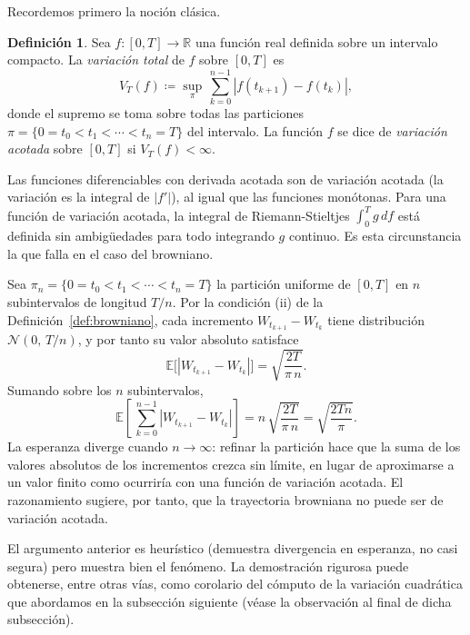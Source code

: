 \documentclass[11pt,a4paper,oneside]{report}
\theoremstyle{plain}
\theoremstyle{definition}
\newtheorem{definicion}[teorema]{Definición}
\theoremstyle{remark}
\newcommand{\R}{\mathbb{R}}
\newcommand{\E}{\mathbb{E}}
\newcommand{\1}{\mathbf{1}}
\newcommand{\eqdef}{\coloneqq}
\begin{document}
Recordemos primero la
noción clásica.

\begin{definicion}
\label{def:variacion_total}
Sea $f : [0, T] \to \R$ una función real definida sobre un intervalo
compacto. La \emph{variación total} de $f$ sobre $[0, T]$ es
\begin{equation*}
  V_T(f) \eqdef \sup_{\pi}\, \sum_{k=0}^{n-1} |f(t_{k+1}) - f(t_k)|,
\end{equation*}
donde el supremo se toma sobre todas las particiones $\pi = \{0 = t_0
< t_1 < \cdots < t_n = T\}$ del intervalo. La función $f$ se dice de
\emph{variación acotada} sobre $[0, T]$ si $V_T(f) < \infty$.
\end{definicion}

Las funciones diferenciables con derivada acotada son de variación
acotada (la variación es la integral de $|f'|$), al igual que las
funciones monótonas. Para una función de variación acotada, la
integral de Riemann-Stieltjes $\int_0^T g\, df$ está definida sin
ambigüedades para todo integrando $g$ continuo. Es esta circunstancia
la que falla en el caso del browniano.

Sea $\pi_n = \{0 = t_0 < t_1
< \cdots < t_n = T\}$ la partición uniforme de $[0, T]$ en $n$
subintervalos de longitud $T/n$. Por la condición (ii) de la
Definición~\ref{def:browniano}, cada incremento $W_{t_{k+1}} -
W_{t_k}$ tiene distribución $\mathcal{N}(0,\, T/n)$, y por tanto su
valor absoluto satisface
\begin{equation*}
  \E\bigl[|W_{t_{k+1}} - W_{t_k}|\bigr]
  = \sqrt{\frac{2T}{\pi\, n}}.
\end{equation*}
Sumando sobre los $n$ subintervalos,
\begin{equation*}
  \E\!\left[\,\sum_{k=0}^{n-1} |W_{t_{k+1}} - W_{t_k}|\right]
  = n\, \sqrt{\frac{2T}{\pi\, n}}
  = \sqrt{\frac{2 T n}{\pi}}.
\end{equation*}
La esperanza diverge cuando $n \to \infty$: refinar la partición hace
que la suma de los valores absolutos de los incrementos crezca sin
límite, en lugar de aproximarse a un valor finito como ocurriría con
una función de variación acotada. El razonamiento sugiere, por tanto,
que la trayectoria browniana no puede ser de variación acotada.

El argumento anterior es heurístico (demuestra divergencia en
esperanza, no casi segura) pero muestra bien el fenómeno. La demostración
rigurosa puede obtenerse, entre otras vías, como corolario del cómputo
de la variación cuadrática que abordamos en la subsección siguiente
(véase la observación al final de dicha subsección).
\end{document}
